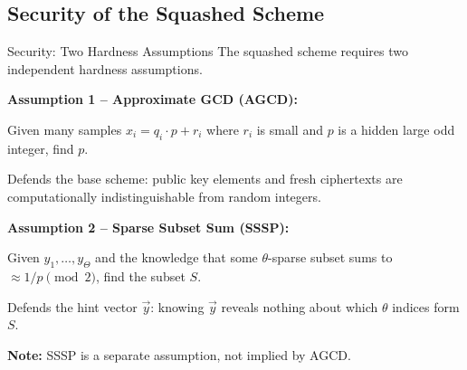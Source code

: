 \documentclass[10pt,handout]{beamer}
\begin{document}



\subsection{Security of the Squashed Scheme}

\begin{frame}{Security: Two Hardness Assumptions}
    The squashed scheme requires two independent hardness assumptions.
    \pause

    \vspace{0.3cm}
    \textbf{Assumption 1  --  Approximate GCD (AGCD):}

    Given many samples $x_i = q_i \cdot p + r_i$ where $r_i$ is small
    and $p$ is a hidden large odd integer, find $p$.

    \vspace{0.1cm}
    Defends the base scheme: public key elements and fresh ciphertexts
    are computationally indistinguishable from random integers.
    \pause

    \vspace{0.3cm}
    \textbf{Assumption 2  --  Sparse Subset Sum (SSSP):}

    Given $y_1, \ldots, y_\Theta$ and the knowledge that some
    $\theta$-sparse subset sums to $\approx 1/p \pmod{2}$,
    find the subset $S$.

    \vspace{0.1cm}
    Defends the hint vector $\vec{y}$: knowing $\vec{y}$ reveals nothing
    about which $\theta$ indices form $S$.
    \pause

    \vspace{0.3cm}
    \textbf{Note:} SSSP is a separate assumption, not implied by AGCD.
\end{frame}
\end{document}
